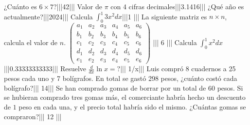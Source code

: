 ¿Cuánto es \(6 \times 7\)?|||42|||
Valor de \(\pi\) con 4 cifras decimales|||3.1416|||
¿Qué año es actualmente?|||2024|||
Calcula \(\int_0^1 3x^2 dx\)|||1 |||
La siguiente matriz es \(n\times n\), calcula el valor de \(n\). \( \begin{pmatrix} a_1 & a_2 & a_3 & a_4 & a_5 & a_6 \\ 
b_1 & b_2 & b_3 & b_4 & b_5 & b_6 \\ c_1 & c_2 & c_3 & c_4 & c_5 & c_6 \\ d_1 & d_2 & d_3 & d_4 & d_5 & d_6 
\\ e_1 & e_2 & e_3 & e_4 & e_5 & e_6 \end{pmatrix}  \) |||  6 |||
Calcula \(\int_0^1 x^2  dx\)|||0.33333333333|||
Resuelve \( \frac{d}{dx} \ln x = ? \)||| 1/x|||
 Luis compró 8 cuadernos a 25 pesos cada uno y 7 bolígrafos. En total se gastó 298 pesos, ¿cuánto costó cada bolígrafo?||| 14||| 
Se han comprado gomas de borrar por un total de \(60\) pesos. Si se hubieran comprado tres gomas más, el comerciante habría hecho un descuento de \(1\) peso en cada una, y el precio total habría sido el mismo. ¿Cuántas gomas se compraron?||| 12 ||| 
